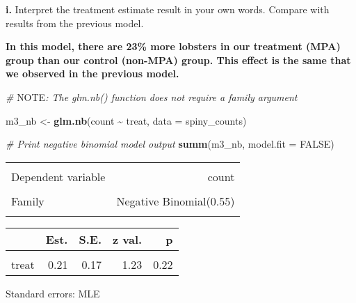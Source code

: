 \documentclass[
]{article}
\newenvironment{Shaded}{\begin{snugshade}}{\end{snugshade}}
\newcommand{\AlertTok}[1]{\textcolor[rgb]{0.94,0.16,0.16}{#1}}
\newcommand{\AttributeTok}[1]{\textcolor[rgb]{0.13,0.29,0.53}{#1}}
\newcommand{\CommentTok}[1]{\textcolor[rgb]{0.56,0.35,0.01}{\textit{#1}}}
\newcommand{\ConstantTok}[1]{\textcolor[rgb]{0.56,0.35,0.01}{#1}}
\newcommand{\FunctionTok}[1]{\textcolor[rgb]{0.13,0.29,0.53}{\textbf{#1}}}
\newcommand{\NormalTok}[1]{#1}
\newcommand{\OtherTok}[1]{\textcolor[rgb]{0.56,0.35,0.01}{#1}}
\newcommand{\SpecialCharTok}[1]{\textcolor[rgb]{0.81,0.36,0.00}{\textbf{#1}}}
\begin{document}
\textbf{i.} Interpret the treatment estimate result in your own words.
Compare with results from the previous model.

\textbf{In this model, there are 23\% more lobsters in our treatment
(MPA) group than our control (non-MPA) group. This effect is the same
that we observed in the previous model.}

\begin{Shaded}
\begin{Highlighting}[]
\CommentTok{\# }\AlertTok{NOTE}\CommentTok{: The \textasciigrave{}glm.nb()\textasciigrave{} function does not require a \textasciigrave{}family\textasciigrave{} argument}

\NormalTok{m3\_nb }\OtherTok{\textless{}{-}} \FunctionTok{glm.nb}\NormalTok{(count }\SpecialCharTok{\textasciitilde{}}\NormalTok{ treat,}
               \AttributeTok{data =}\NormalTok{ spiny\_counts)}

\CommentTok{\# Print negative binomial model output}
\FunctionTok{summ}\NormalTok{(m3\_nb, }\AttributeTok{model.fit =} \ConstantTok{FALSE}\NormalTok{)}
\end{Highlighting}
\end{Shaded}

\begin{table}[!h]
\centering
\begin{tabular}{lr}
\toprule
\cellcolor{gray!10}{Observations} & \cellcolor{gray!10}{252}\\
Dependent variable & count\\
\cellcolor{gray!10}{Type} & \cellcolor{gray!10}{Generalized linear model}\\
Family & Negative Binomial(0.55)\\
\cellcolor{gray!10}{Link} & \cellcolor{gray!10}{log}\\
\bottomrule
\end{tabular}
\end{table}  \begin{table}[!h]
\centering
\begin{threeparttable}
\begin{tabular}{lrrrr}
\toprule
  & Est. & S.E. & z val. & p\\
\midrule
\cellcolor{gray!10}{(Intercept)} & \cellcolor{gray!10}{3.12} & \cellcolor{gray!10}{0.12} & \cellcolor{gray!10}{26.40} & \cellcolor{gray!10}{0.00}\\
treat & 0.21 & 0.17 & 1.23 & 0.22\\
\bottomrule
\end{tabular}
\begin{tablenotes}
\item Standard errors: MLE
\end{tablenotes}
\end{threeparttable}
\end{table}
\end{document}
